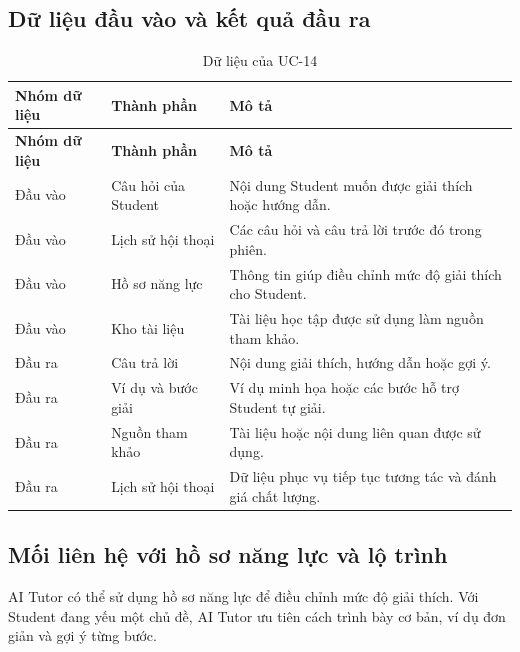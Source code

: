 \subsection{Dữ liệu đầu vào và kết quả đầu ra}

\begin{longtable}{|p{3.5cm}|p{5.3cm}|p{5.6cm}|}
	\caption{Dữ liệu của UC-14}
	\label{tab:uc14-data}\\
	\hline
	\textbf{Nhóm dữ liệu} &
	\textbf{Thành phần} &
	\textbf{Mô tả} \\
	\hline
	\endfirsthead
	
	\hline
	\textbf{Nhóm dữ liệu} &
	\textbf{Thành phần} &
	\textbf{Mô tả} \\
	\hline
	\endhead
	
	Đầu vào &
	Câu hỏi của Student &
	Nội dung Student muốn được giải thích hoặc hướng dẫn. \\
	\hline
	
	Đầu vào &
	Lịch sử hội thoại &
	Các câu hỏi và câu trả lời trước đó trong phiên. \\
	\hline
	
	Đầu vào &
	Hồ sơ năng lực &
	Thông tin giúp điều chỉnh mức độ giải thích cho Student. \\
	\hline
	
	Đầu vào &
	Kho tài liệu &
	Tài liệu học tập được sử dụng làm nguồn tham khảo. \\
	\hline
	
	Đầu ra &
	Câu trả lời &
	Nội dung giải thích, hướng dẫn hoặc gợi ý. \\
	\hline
	
	Đầu ra &
	Ví dụ và bước giải &
	Ví dụ minh họa hoặc các bước hỗ trợ Student tự giải. \\
	\hline
	
	Đầu ra &
	Nguồn tham khảo &
	Tài liệu hoặc nội dung liên quan được sử dụng. \\
	\hline
	
	Đầu ra &
	Lịch sử hội thoại &
	Dữ liệu phục vụ tiếp tục tương tác và đánh giá chất lượng. \\
	\hline
	
\end{longtable}

\subsection{Mối liên hệ với hồ sơ năng lực và lộ trình}

AI Tutor có thể sử dụng hồ sơ năng lực để điều chỉnh mức độ giải thích.
Với Student đang yếu một chủ đề, AI Tutor ưu tiên cách trình bày cơ bản,
ví dụ đơn giản và gợi ý từng bước.

